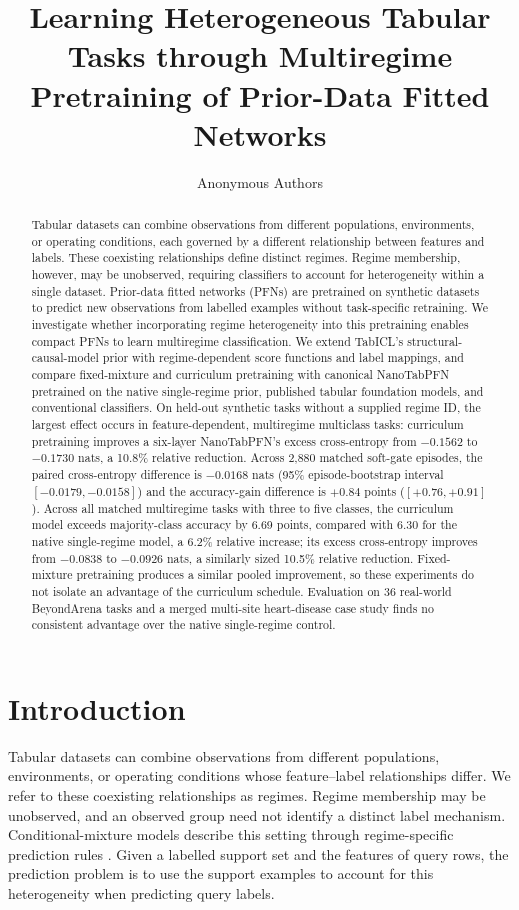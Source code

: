 \documentclass{article}
\title{Learning Heterogeneous Tabular Tasks through Multiregime Pretraining of Prior-Data Fitted Networks}
\author{Anonymous Authors}
\begin{document}
\maketitle
\begin{abstract}
Tabular datasets can combine observations from different populations, environments, or operating conditions, each governed by a different relationship between features and labels. These coexisting relationships define distinct regimes. Regime membership, however, may be unobserved, requiring classifiers to account for heterogeneity within a single dataset. Prior-data fitted networks (PFNs) are pretrained on synthetic datasets to predict new observations from labelled examples without task-specific retraining. We investigate whether incorporating regime heterogeneity into this pretraining enables compact PFNs to learn multiregime classification. We extend TabICL's structural-causal-model prior with regime-dependent score functions and label mappings, and compare fixed-mixture and curriculum pretraining with canonical NanoTabPFN pretrained on the native single-regime prior, published tabular foundation models, and conventional classifiers. On held-out synthetic tasks without a supplied regime ID, the largest effect occurs in feature-dependent, multiregime multiclass tasks: curriculum pretraining improves a six-layer NanoTabPFN's excess cross-entropy from $-0.1562$ to $-0.1730$ nats, a 10.8\% relative reduction. Across 2,880 matched soft-gate episodes, the paired cross-entropy difference is $-0.0168$ nats (95\% episode-bootstrap interval $[-0.0179,-0.0158]$) and the accuracy-gain difference is $+0.84$ points ($[+0.76,+0.91]$). Across all matched multiregime tasks with three to five classes, the curriculum model exceeds majority-class accuracy by 6.69 points, compared with 6.30 for the native single-regime model, a 6.2\% relative increase; its excess cross-entropy improves from $-0.0838$ to $-0.0926$ nats, a similarly sized 10.5\% relative reduction. Fixed-mixture pretraining produces a similar pooled improvement, so these experiments do not isolate an advantage of the curriculum schedule. Evaluation on 36 real-world BeyondArena tasks and a merged multi-site heart-disease case study finds no consistent advantage over the native single-regime control.
\end{abstract}

\section{Introduction}
Tabular datasets can combine observations from different populations, environments, or operating conditions whose feature--label relationships differ. We refer to these coexisting relationships as regimes. Regime membership may be unobserved, and an observed group need not identify a distinct label mechanism. Conditional-mixture models describe this setting through regime-specific prediction rules \citep{jacobs1991experts,jordan1994hierarchical}. Given a labelled support set and the features of query rows, the prediction problem is to use the support examples to account for this heterogeneity when predicting query labels.
\end{document}
